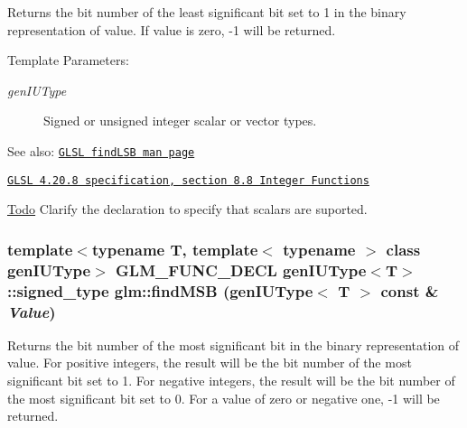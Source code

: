 Returns the bit number of the least significant bit set to 1 in the binary representation of value. If value is zero, -1 will be returned.

\begin{Desc}
\item[Template Parameters:]
\begin{description}
\item[{\em genIUType}]Signed or unsigned integer scalar or vector types.\end{description}
\end{Desc}
\begin{Desc}
\item[See also:]\href{http://www.opengl.org/sdk/docs/manglsl/xhtml/findLSB.xml}{\tt GLSL findLSB man page} 

\href{http://www.opengl.org/registry/doc/GLSLangSpec.4.20.8.pdf}{\tt GLSL 4.20.8 specification, section 8.8 Integer Functions}\end{Desc}
\begin{Desc}
\item[\hyperlink{todo__todo000046}{Todo}]Clarify the declaration to specify that scalars are suported. \end{Desc}
\hypertarget{group__core__func__integer_g13ed58e71232a63dbc132b1be0f0ee9a}{
\subsubsection[findMSB]{\setlength{\rightskip}{0pt plus 5cm}template$<$typename T, template$<$ typename $>$ class genIUType$>$ GLM\_\-FUNC\_\-DECL genIUType$<$T$>$::signed\_\-type glm::findMSB (genIUType$<$ T $>$ const \& {\em Value})}}
\label{group__core__func__integer_g13ed58e71232a63dbc132b1be0f0ee9a}


Returns the bit number of the most significant bit in the binary representation of value. For positive integers, the result will be the bit number of the most significant bit set to 1. For negative integers, the result will be the bit number of the most significant bit set to 0. For a value of zero or negative one, -1 will be returned.

